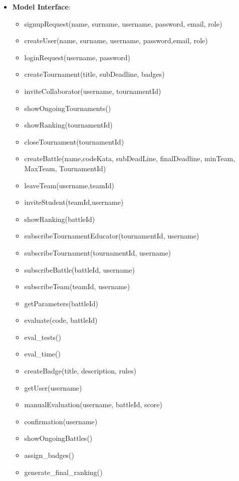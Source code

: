 \begin{itemize}
    \item\textbf{Model Interface}:
        \begin{itemize}
            \item signupRequest(name, surname, username, password, email, role)
            \item createUser(name, surname, username, password,email, role)
            \item loginRequest(username, password)
            \item createTournament(title, subDeadline, badges)
            \item inviteCollaborator(username, tournamentId)
            \item showOngoingTournaments()
            \item showRanking(tournamentId)
            \item closeTournament(tournamentId)
            \item createBattle(name,codeKata, subDeadLine, finalDeadline, minTeam, MaxTeam, TournamentId)
            \item leaveTeam(username,teamId)
            \item inviteStudent(teamId,username)
            \item showRanking(battleId)
            \item subscribeTournamentEducator(tournamentId, username)
            \item subscribeTournament(tournamentId, username)
            \item subscribeBattle(battleId, username)
            \item subscribeTeam(teamId, username)
            \item getParameters(battleId)
            \item evaluate(code, battleId)
            \item eval\_tests()
            \item eval\_time()
            \item createBadge(title, description, rules)
            \item getUser(username)
            \item manualEvaluation(username, battleId, score)
            \item confirmation(username)
            \item showOngoingBattles()
            \item assign\_badges()
            \item generate\_final\_ranking()
            

\end{itemize}
\end{itemize}
